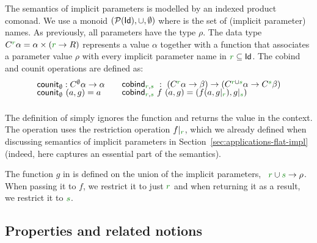 \begin{example}
The semantics of implicit parameters is modelled by an indexed product comonad. We use a monoid
$(\mathcal{P}(\textnormal{\sffamily Id}), \cup, \emptyset)$ where  is the set of (implicit parameter) names.
As previously, all parameters have the type $\rho$. The data type $\ctyp{\cclrd{r}}{\alpha}
= \alpha \times (\cclrd{r} \rightarrow R)$ represents a value $\alpha$ together with a function that
associates a parameter value $\rho$ with every implicit parameter name in $\cclrd{r} \subseteq \ident{Id}$.
The cobind and counit operations are defined as:
%
\begin{equation*}
\begin{array}{l}
\ident{counit}_{\emptyset} : \ctyp{\emptyset}{\alpha} \rightarrow \alpha \\[-0.25em]
\ident{counit}_{\emptyset}~(a, g) = a\\[0.5em]
\end{array}
\quad
\begin{array}{l}
\ident{cobind}_{\cclrd{r},\cclrd{s}} ~:~ (\ctyp{\cclrd{r}}{\alpha} \rightarrow \beta) 
    \rightarrow (\ctyp{\cclrd{r}\cup\cclrd{s}}{\alpha} \rightarrow \ctyp{\cclrd{s}}{\beta})\\[-0.25em]
\ident{cobind}_{\cclrd{r},\cclrd{s}}~f~(a,g) = (f(a,\restr{g}{\cclrd{r}}), \restr{g}{\cclrd{s}})\\[0.5em]
\end{array}
\end{equation*}
\end{example}

\noindent
The definition of  simply ignores the function and returns the value in the context.
The  operation uses the restriction operation $\restr{f}{\cclrd{r}}$, which we 
already defined when discussing semantics of implicit parameters in Section~\ref{sec:applications-flat-impl}
(indeed,  here captures an essential part of the semantics).

The function $g$ in  is defined on the union of the implicit parameters, 
\ie~$\cclrd{r}\cup\cclrd{s}\rightarrow\rho$. When passing it to $f$, we restrict it to
just $\cclrd{r}$ and when returning it as a result, we restrict it to $\cclrd{s}$.


\subsection{Properties and related notions}

